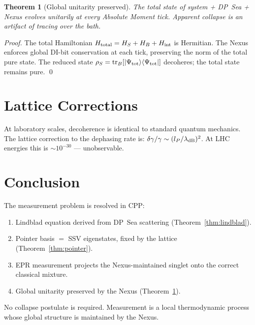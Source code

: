 \documentclass[11pt,a4paper]{article}
\newtheorem{theorem}{Theorem}[section]
\newcommand{\lP}{l_P}
\newcommand{\ket}[1]{|#1\rangle}
\newcommand{\bra}[1]{\langle#1|}
\begin{document}
\begin{theorem}[Global unitarity preserved]
\label{thm:unitary}
The total state of system + DP~Sea + Nexus evolves unitarily at every
Absolute Moment tick.  Apparent collapse is an artifact of tracing
over the bath.
\end{theorem}

\begin{proof}
The total Hamiltonian $H_{\rm total} = H_S + H_B + H_{\rm int}$
is Hermitian.  The Nexus enforces global DI-bit conservation at each
tick, preserving the norm of the total pure state.  The reduced state
$\rho_S = \mathrm{tr}_B[\ket{\Psi_{\rm tot}}\bra{\Psi_{\rm tot}}]$
decoheres; the total state remains pure. \qed
\end{proof}

\section{Lattice Corrections}

At laboratory scales, decoherence is identical to standard quantum
mechanics.  The lattice correction to the dephasing rate is:
$\delta\gamma/\gamma \sim (\lP/\lambda_{\rm dB})^2$.  At LHC energies
this is $\sim 10^{-30}$ --- unobservable.

\section{Conclusion}

The measurement problem is resolved in CPP:
\begin{enumerate}
\item Lindblad equation derived from DP~Sea scattering
  (Theorem~\ref{thm:lindblad}).
\item Pointer basis $=$ SSV eigenstates, fixed by the lattice
  (Theorem~\ref{thm:pointer}).
\item EPR measurement projects the Nexus-maintained singlet onto the
  correct classical mixture.
\item Global unitarity preserved by the Nexus
  (Theorem~\ref{thm:unitary}).
\end{enumerate}
No collapse postulate is required.  Measurement is a local thermodynamic
process whose global structure is maintained by the Nexus.
\end{document}
